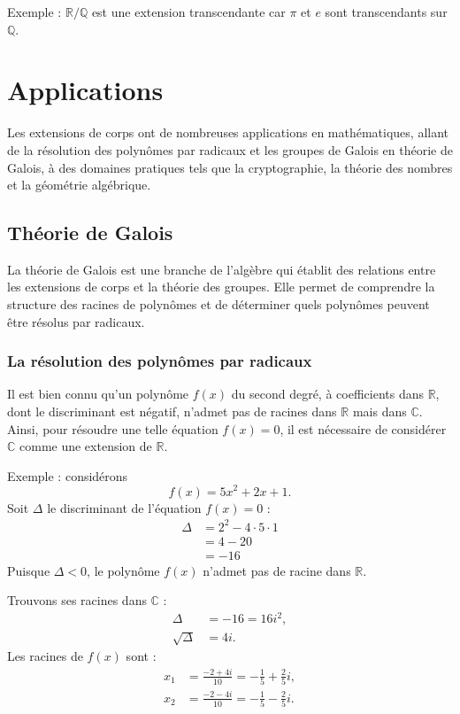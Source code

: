 \documentclass{article}
\begin{document}
Exemple : $\mathbb{R}/\mathbb{Q}$ est une extension transcendante car $\pi$ et $e$ sont transcendants sur $\mathbb{Q}$.

\section{Applications}
Les extensions de corps ont de nombreuses applications en mathématiques, allant de la résolution des polynômes par radicaux et les groupes de Galois en théorie de Galois, à des domaines pratiques tels que la cryptographie, la théorie des nombres et la géométrie algébrique.

\subsection{Théorie de Galois}
La théorie de Galois est une branche de l'algèbre qui établit des relations entre les extensions de corps et la théorie des groupes. Elle permet de comprendre la structure des racines de polynômes et de déterminer quels polynômes peuvent être résolus par radicaux.

\subsubsection{La résolution des polynômes par radicaux}
Il est bien connu qu'un polynôme $f(x)$ du second degré, à coefficients dans $\mathbb{R}$, dont le discriminant est négatif, n'admet pas de racines dans $\mathbb{R}$ mais dans $\mathbb{C}$. Ainsi, pour résoudre une telle équation $f(x)=0$, il est nécessaire de considérer $\mathbb{C}$ comme une extension de $\mathbb{R}$.

Exemple : considérons
\[
f(x)=5x^2+2x+1.
\]
Soit $\Delta$ le discriminant de l'équation $f(x)=0$ :
\begin{align*}
\Delta &= 2^2-4\cdot 5\cdot 1 \\
&= 4-20 \\
&= -16
\end{align*}
Puisque $\Delta<0$, le polynôme $f(x)$ n'admet pas de racine dans $\mathbb{R}$.

Trouvons ses racines dans $\mathbb{C}$ :
\begin{align*}
\Delta &= -16 = 16i^2,\\
\sqrt{\Delta} &= 4i.
\end{align*}
Les racines de $f(x)$ sont :
\begin{align*}
x_1 &= \frac{-2+4i}{10}=-\frac15+\frac25 i,\\
x_2 &= \frac{-2-4i}{10}=-\frac15-\frac25 i.
\end{align*}
\end{document}
